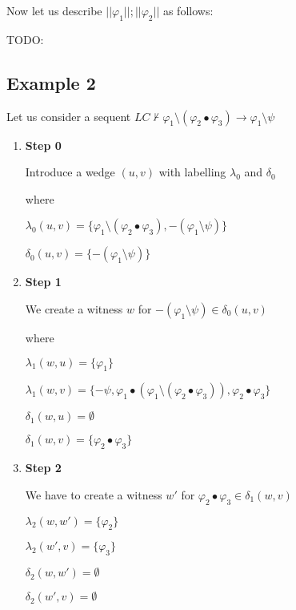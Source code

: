 \documentclass[a4paper]{article}
\theoremstyle{defin}
\theoremstyle{theorem}
\theoremstyle{claim}
\theoremstyle{prop}
\theoremstyle{lemma}
\theoremstyle{fact}
\theoremstyle{ex}
\theoremstyle{col}
\begin{document}
Now let us describe $||\varphi_1|| ; ||\varphi_2||$ as follows:

TODO:

\subsection{Example 2}

Let us consider a sequent $LC \not\vdash \varphi_1 \setminus (\varphi_2 \bullet \varphi_3) \rightarrow \varphi_1 \setminus \psi$

\begin{enumerate}
\item {\bf Step 0}

Introduce a wedge $(u, v)$ with labelling $\lambda_0$ and $\delta_0$

\centerline{
}

where

\begin{center}
$\lambda_0(u, v) = \{\varphi_1 \setminus (\varphi_2 \bullet \varphi_3), -(\varphi_1 \setminus \psi)\}$

$\delta_0(u, v) = \{ -(\varphi_1 \setminus \psi) \}$
\end{center}

\item {\bf Step 1}

We create a witness $w$ for $-(\varphi_1 \setminus \psi) \in \delta_0(u, v)$

\centerline{
}
where
\begin{center}
$\lambda_1(w, u) = \{ \varphi_1 \}$

$\lambda_1(w, v) = \{ -\psi, \varphi_1 \bullet (\varphi_1 \setminus (\varphi_2 \bullet \varphi_3)), \varphi_2 \bullet \varphi_3\}$

$\delta_1(w, u) = \emptyset$

$\delta_1(w, v) = \{ \varphi_2 \bullet \varphi_3 \}$

\end{center}

\item {\bf Step 2}

We have to create a witness $w'$ for $\varphi_2 \bullet \varphi_3 \in \delta_1(w, v)$

\centerline{
}

\begin{center}
$\lambda_2(w, w') = \{ \varphi_2 \}$

$\lambda_2(w', v) = \{ \varphi_3 \}$

$\delta_2(w, w') = \emptyset$

$\delta_2(w', v) = \emptyset$
\end{center}

\end{enumerate}
\end{document}

